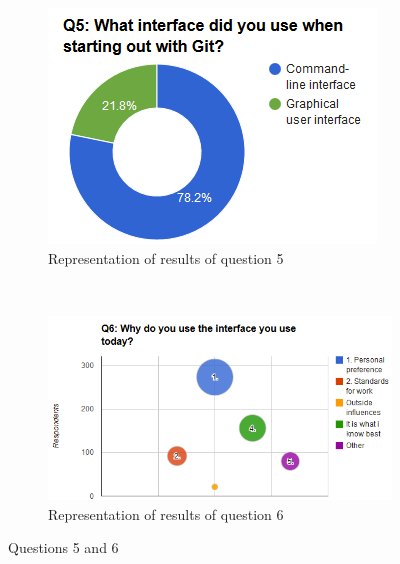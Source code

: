 \documentclass[a4paper,oneside]{bth} %
\begin{document}
			\begin{figure}[H]
				\centering
				\begin{subfigure}[b]{0.45\textwidth}
					\includegraphics[width=\textwidth]{graphs/q5.png}
					\caption{Representation of results of question 5}
					\label{fig:q5}
				\end{subfigure}
				~
				\begin{subfigure}[b]{0.45\textwidth}
					\includegraphics[width=\textwidth]{graphs/q6.png}
					\caption{Representation of results of question 6}
					\label{fig:q6}
				\end{subfigure}
				\caption{Questions 5 and 6}\label{fig:q5-q6}
			\end{figure}
\end{document}
